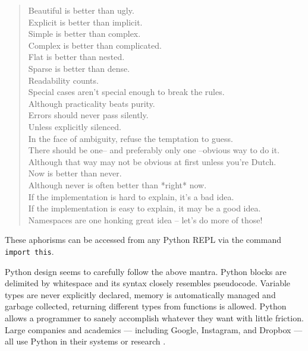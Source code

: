 \documentclass{report}
\begin{document}
\begin{singlespace*}
\begin{quote}
    Beautiful is better than ugly. \\
    Explicit is better than implicit. \\
    Simple is better than complex. \\
    Complex is better than complicated. \\
    Flat is better than nested. \\
    Sparse is better than dense. \\
    Readability counts. \\
    Special cases aren't special enough to break the rules. \\
    Although practicality beats purity. \\
    Errors should never pass silently. \\
    Unless explicitly silenced. \\
    In the face of ambiguity, refuse the temptation to guess. \\
    There should be one-- and preferably only one --obvious way to do it. \\
    Although that way may not be obvious at first unless you're Dutch. \\
    Now is better than never. \\
    Although never is often better than *right* now. \\
    If the implementation is hard to explain, it's a bad idea. \\
    If the implementation is easy to explain, it may be a good idea. \\
    Namespaces are one honking great idea -- let's do more of those!
\end{quote}
\end{singlespace*}
These aphorisms can be accessed from any Python REPL via the command \texttt{import this}.

Python design seems to carefully follow the above mantra. Python blocks are delimited by whitespace and its syntax closely resembles pseudocode. Variable types are never explicitly declared, memory is automatically managed and garbage collected, returning different types from functions is allowed. Python allows a programmer to sanely accomplish whatever they want with little friction. Large companies and academics --- including Google, Instagram, and Dropbox --- all use Python in their systems or research \cite{python-quotes}.
\end{document}
